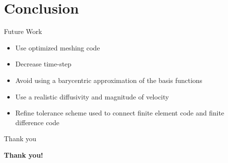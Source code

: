 \documentclass[10pt]{beamer}
\begin{document}
\section{Conclusion}

\begin{frame}{Future Work} \label{FW}
\begin{itemize}
\item<1-> Use optimized meshing code
\item<2->  Decrease time-step
\item<3->  Avoid using a barycentric approximation of the basis functions
\item<4->  Use a realistic diffusivity and magnitude of velocity
\item<5->  Refine tolerance scheme used to connect finite element code and finite difference code
\end{itemize}
\hyperlink{Questions}{}
\end{frame}

\begin{frame}{Thank you}
    \begin{center}
        {\bf Thank you!}
    \end{center}
\end{frame}
\end{document}
